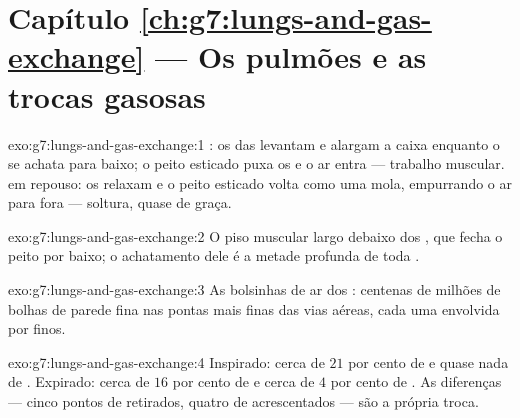 \section*{Capítulo \ref{ch:g7:lungs-and-gas-exchange} --- Os pulmões e as trocas gasosas}

\begin{solution}{exo:g7:lungs-and-gas-exchange:1}
: os  das  levantam e alargam a caixa
enquanto o  se achata para baixo; o peito esticado puxa os
 e o ar entra --- trabalho muscular.  em repouso: os
 relaxam e o peito esticado volta como uma mola, empurrando o
ar para fora --- soltura, quase de graça.
\end{solution}

\begin{solution}{exo:g7:lungs-and-gas-exchange:2}
O piso muscular largo debaixo dos , que fecha o peito por
baixo; o achatamento dele é a metade profunda de toda .
\end{solution}

\begin{solution}{exo:g7:lungs-and-gas-exchange:3}
As bolsinhas de ar dos : centenas de milhões de bolhas de
parede fina nas pontas mais finas das vias aéreas, cada uma envolvida
por  finos.
\end{solution}

\begin{solution}{exo:g7:lungs-and-gas-exchange:4}
Inspirado: cerca de $21$ por cento de  e quase nada de . Expirado: cerca de $16$ por cento de  e cerca de
$4$ por cento de . As diferenças --- cinco pontos de
 retirados, quatro de  acrescentados --- são a
própria troca.
\end{solution}

